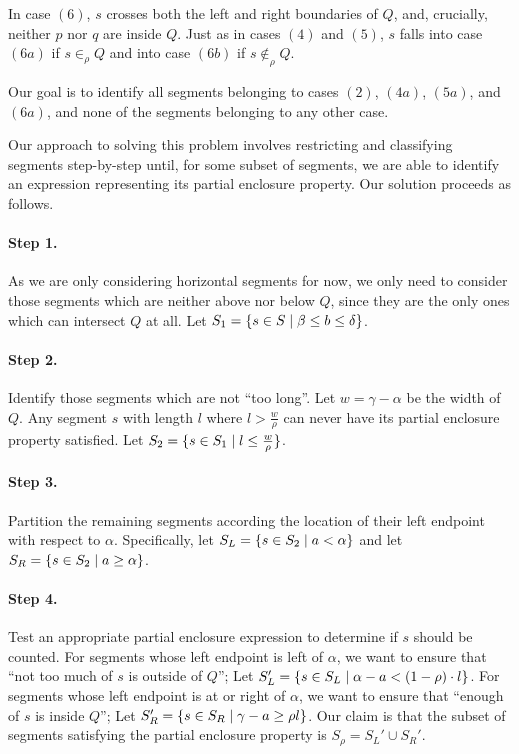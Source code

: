 In case $(6)$, $s$ crosses both the left and right boundaries of $Q$, and, crucially, neither $p$ nor $q$ are inside $Q$. 
Just as in cases $(4)$ and $(5)$, $s$ falls into case $(6a)$ if $s \in_\rho Q$ and into case $(6b)$ if $s \not \in_\rho Q$.

Our goal is to identify all segments belonging to cases $(2)$, $(4a)$, $(5a)$, and $(6a)$, and none of the segments belonging to any other case.

Our approach to solving this problem involves restricting and classifying segments step-by-step until, for some subset of segments, we are able to identify an expression representing its partial enclosure property.  Our solution proceeds as follows.

\paragraph{Step 1.} As we are only considering horizontal segments for now, we only need to consider those segments which are neither above nor below $Q$, since they are the only ones which can intersect $Q$ at all. Let $S_1 = \{ s \in S \;|\; \beta \leq b \leq \delta\}$. 

\paragraph{Step 2.} Identify those segments which are not ``too long''.  
Let $w = \gamma - \alpha$ be the width of $Q$.
Any segment $s$ with length $l$ where $l > \frac{w}{\rho}$ can never have its partial enclosure property satisfied.
Let $S_2 = \{ s \in S_1 \;|\; l \leq \frac{w}{\rho} \}$.

\paragraph{Step 3.} Partition the remaining segments according the location of their left endpoint with respect to $\alpha$.
Specifically, let $S_L = \{s \in S_2 \;|\; a < \alpha \}$ and let $S_R = \{ s \in S_2 \;|\; a \geq \alpha \}$.

\paragraph{Step 4.} Test an appropriate partial enclosure expression to determine if $s$ should be counted.
For segments whose left endpoint is left of $\alpha$, we want to ensure that ``not too much of $s$ is outside of $Q$''; Let $S_L' = \{ s \in S_L \;|\; \alpha - a < (1 - \rho) \cdot l\}$.
For segments whose left endpoint is at or right of $\alpha$, we want to ensure that ``enough of $s$ is inside $Q$''; Let $S_R' = \{ s \in S_R \;|\; \gamma - a \geq  \rho l \}$.
Our claim is that the subset of segments satisfying the partial enclosure property is $S_\rho = S_L' \cup S_R'$. 

